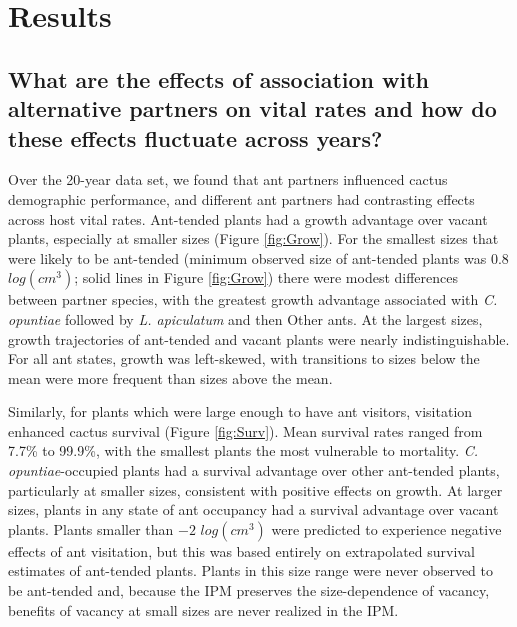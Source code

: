 \documentclass[11pt]{article}
\begin{document}
\section*{Results}
\subsection*{What are the effects of association with alternative partners on vital rates and how do these effects fluctuate across years?}
Over the 20-year data set, we found that ant partners influenced cactus demographic performance, and different ant partners had contrasting effects across host vital rates. 
Ant-tended plants had a growth advantage over vacant plants, especially at smaller sizes (Figure \ref{fig:Grow}).
For the smallest sizes that were likely to be ant-tended (minimum observed size of ant-tended plants was $0.8$ $log(cm^3)$; solid lines in Figure \ref{fig:Grow}) there were modest differences between partner species, with the greatest growth advantage associated with \textit{C. opuntiae} followed by \textit{L. apiculatum} and then Other ants.
At the largest sizes, growth trajectories of ant-tended and vacant plants were nearly indistinguishable. 
For all ant states, growth was left-skewed, with transitions to sizes below the mean were more frequent than sizes above the mean. 

Similarly, for plants which were large enough to have ant visitors, visitation enhanced cactus survival (Figure \ref{fig:Surv}). 
Mean survival rates ranged from 7.7\% to 99.9\%, with the smallest plants the most vulnerable to mortality. 
\textit{C. opuntiae}-occupied plants had a survival advantage over other ant-tended plants, particularly at smaller sizes, consistent with positive effects on growth. 
At larger sizes, plants in any state of ant occupancy had a survival advantage over vacant plants. 
Plants smaller than $-2$ $log(cm^3)$ were predicted to experience negative effects of ant visitation, but this was based entirely on extrapolated survival estimates of ant-tended plants. 
Plants in this size range were never observed to be ant-tended and, because the IPM preserves the size-dependence of vacancy, benefits of vacancy at small sizes are never realized in the IPM. 
\end{document}

